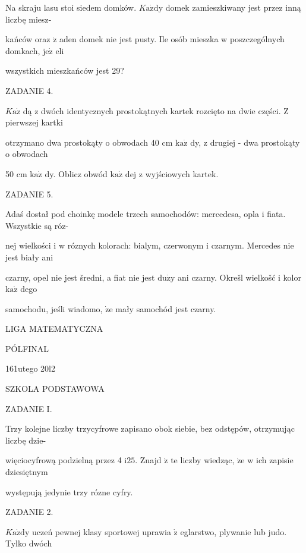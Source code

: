 \documentclass[a4paper,12pt]{article}
\begin{document}
Na skraju lasu stoi siedem domków. $K\mathrm{a}\dot{\mathrm{z}}\mathrm{d}\mathrm{y}$ domek zamieszkiwany jest przez inną liczbę miesz-

kańców oraz $\dot{\mathrm{z}}$ aden domek nie jest pusty. Ile osób mieszka w poszczególnych domkach, $\mathrm{j}\mathrm{e}\dot{\mathrm{z}}$ eli

wszystkich mieszkańców jest 29?

ZADANIE 4.

$K\mathrm{a}\dot{\mathrm{z}}$ dą z dwóch identycznych prostokątnych kartek rozcięto na dwie części. $\mathrm{Z}$ pierwszej kartki

otrzymano dwa prostokąty o obwodach 40 cm $\mathrm{k}\mathrm{a}\dot{\mathrm{z}}$ dy, z drugiej - dwa prostokąty o obwodach

50 cm $\mathrm{k}\mathrm{a}\dot{\mathrm{z}}$ dy. Oblicz obwód $\mathrm{k}\mathrm{a}\dot{\mathrm{z}}$ dej z wyjściowych kartek.

ZADANIE 5.

Adaś dostał pod choinkę modele trzech samochodów: mercedesa, opla i fiata. Wszystkie są róz-

nej wielkości i w róznych kolorach: bialym, czerwonym i czarnym. Mercedes nie jest biały ani

czarny, opel nie jest šredni, a fiat nie jest $\mathrm{d}\mathrm{u}\dot{\mathrm{z}}\mathrm{y}$ ani czarny. Okrešl wielkošć i kolor $\mathrm{k}\mathrm{a}\dot{\mathrm{z}}$ dego

samochodu, jeśli wiadomo, $\dot{\mathrm{z}}\mathrm{e}$ mały samochód jest czarny.






LIGA MATEMATYCZNA

PÓLFINAL

161utego 20l2

SZKOLA PODSTAWOWA

ZADANIE I.

Trzy kolejne liczby trzycyfrowe zapisano obok siebie, bez odstępów, otrzymując liczbę dzie-

więciocyfrową podzielną przez 4 $\mathrm{i}25.$ Znajd $\acute{\mathrm{z}}$ te liczby wiedząc, $\dot{\mathrm{z}}\mathrm{e}$ w ich zapisie dziesiętnym

występują jedynie trzy rózne cyfry.

ZADANIE 2.

$K\mathrm{a}\dot{\mathrm{z}}\mathrm{d}\mathrm{y}$ uczeń pewnej klasy sportowej uprawia $\dot{\mathrm{z}}$ eglarstwo, plywanie lub judo. Tylko dwóch
\end{document}
